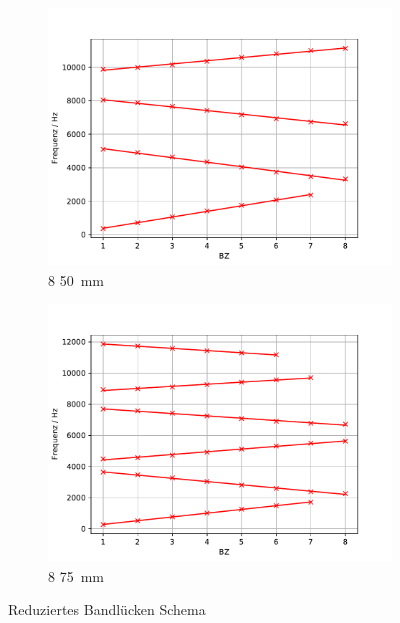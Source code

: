 \begin{figure}
 \centering
 \begin{subfigure}{0.48\textwidth}
  \centering
  \includegraphics[width=1\textwidth]{RedBandSchem.pdf}
  \caption{8 \cdot \SI{50}{mm}}
  \label{fig.RedBandSchem}
 \end{subfigure}
 \begin{subfigure}{0.48\textwidth}
  \centering
  \includegraphics[width=1\textwidth]{RedBandSchem75.pdf}
  \caption{8 \cdot \SI{75}{mm}}
  \label{fig.RedBandSchem75}
 \end{subfigure}
 \caption{Reduziertes Bandlücken Schema}
\end{figure}

